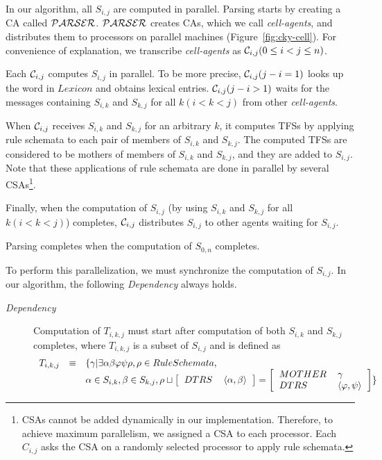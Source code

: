   In our algorithm, all $S_{i,j}$ are computed in parallel.  Parsing
starts by creating a CA called ${\cal PARSER}$.  ${\cal PARSER}$
creates CAs, which we call {\it cell-agents}, and distributes them to
processors on parallel machines (Figure~\ref{fig:cky-cell}).  For
convenience of explanation, we transcribe {\it cell-agents}
as ${\cal C}_{i,j} (0 \leq i < j \leq n)$.

  Each ${\cal C}_{i,j}$ computes $S_{i,j}$ in parallel.  To be more
precise, ${\cal C}_{i,j} (j - i = 1)$ looks up the word in $Lexicon$
and obtains lexical entries.  ${\cal C}_{i,j} (j - i > 1)$ waits for
the messages containing $S_{i,k}$ and $S_{k,j}$ for all $k (i < k <
j)$ from other {\it cell-agents}.

  When ${\cal C}_{i,j}$ receives $S_{i,k}$ and $S_{k,j}$ for an
arbitrary $k$, it computes TFSs by applying rule schemata to each pair
of members of $S_{i,k}$ and $S_{k,j}$. The computed TFSs are
considered to be mothers of members of $S_{i,k}$ and $S_{k,j}$, and
they are added to $S_{i,j}$. Note that these applications of rule
schemata are done in parallel by several CSAs\footnote{CSAs cannot be
added dynamically in our implementation.  Therefore, to achieve maximum
parallelism, we assigned a CSA to each processor.  Each $C_{i,j}$ asks
the CSA on a randomly selected processor to apply rule schemata.}.

  Finally, when the computation of $S_{i,j}$ (by using $S_{i,k}$ and
$S_{k,j}$ for all $k(i < k < j)$) completes, ${\cal C}_{i,j}$
distributes $S_{i,j}$ to other agents waiting for $S_{i,j}$.

  Parsing completes when the computation of $S_{0,n}$ completes.

  To perform this parallelization, we must synchronize the computation
of $S_{i,j}$.  In our algorithm, the following {\it Dependency} always
holds.

\begin{description}
\item [{\it Dependency}] Computation of $T_{i,k,j}$ must start after
computation of both $S_{i,k}$ and $S_{k,j}$ completes, where
$T_{i,k,j}$ is a subset of $S_{i,j}$ and is defined as
\[
\begin{array}{lll}
T_{i,k,j} & \equiv & \{\gamma|\exists \alpha \beta \varphi \psi \rho, \rho \in RuleSchemata,\\
	&	& \alpha \in S_{i,k}, \beta \in S_{k,j}, \rho
\sqcup
\left[	\begin{tabular}{ll}
	$DTRS$ & $\langle \alpha, \beta \rangle$\\
	\end{tabular} \right]
=
\left[	\begin{tabular}{ll}
	$MOTHER$ & $\gamma$\\
	$DTRS$ & $\langle \varphi, \psi \rangle$\\
	\end{tabular}
\right]\}\\
\end{array}
\]
\end{description}

